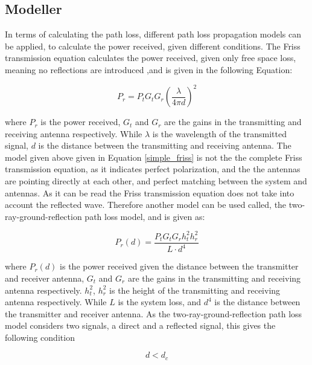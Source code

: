 \subsection{Modeller}

In terms of calculating the path loss, different path loss propagation models can be applied, to calculate the power received, given different conditions. The Friss transmission equation calculates the power received, given only free space loss, meaning no reflections are introduced ,and is given in the following Equation:

\begin{equation}
P_r = P_t G_t G_r (\frac{\lambda}{4 \pi d})^2
\label{simple_friss}
\end{equation}

where $P_{r}$ is the power received, $G_t$ and $G_r$ are the gains in the transmitting and receiving antenna respectively. While $\lambda$ is the wavelength of the transmitted signal, $d$ is the distance between the transmitting and receiving antenna. The model given above given in Equation \ref{simple_friss} is not the the complete Friss transmission equation, as it indicates perfect polarization, and the the antennas are pointing directly at each other, and perfect matching between the system and antennas. As it can be read the Friss transmission equation does not take into account the reflected wave. Therefore another model can be used called, the two-ray-ground-reflection path loss model, and is given as:

\begin{equation}
P_r(d) = \frac{P_t G_t G_r h^2_t h^2_r}{L \cdot d^4}
\label{two_ray_model}
\end{equation}

where $P_r(d)$ is the power received given the distance between the transmitter and receiver antenna, $G_t$ and $G_r$ are the gains in the transmitting and receiving antenna respectively. $h^2_t$, $h^2_r$ is the height of the transmitting and receiving antenna respectively.  While $L$ is the system loss, and $d^{4}$ is the distance between the transmitter and receiver antenna. As the two-ray-ground-reflection path loss model considers two signals, a direct and a reflected signal, this gives the following condition



\begin{equation}
d < d_{c}
\label{two_ray_cond}
\end{equation}

